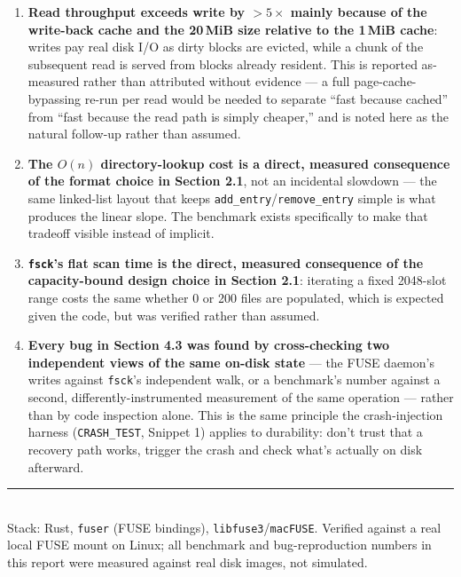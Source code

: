 \documentclass[11pt]{article}
\begin{document}
\begin{enumerate}
    \item \textbf{Read throughput exceeds write by $>5\times$ mainly because of the write-back cache
    and the 20\,MiB size relative to the 1\,MiB cache}: writes pay real disk I/O as dirty blocks are
    evicted, while a chunk of the subsequent read is served from blocks already resident. This is
    reported as-measured rather than attributed without evidence — a full page-cache-bypassing
    re-run per read would be needed to separate ``fast because cached'' from ``fast because the read
    path is simply cheaper,'' and is noted here as the natural follow-up rather than assumed.
    \item \textbf{The $O(n)$ directory-lookup cost is a direct, measured consequence of the format
    choice in Section 2.1}, not an incidental slowdown — the same linked-list layout that keeps
    \texttt{add\_entry}/\texttt{remove\_entry} simple is what produces the linear slope. The
    benchmark exists specifically to make that tradeoff visible instead of implicit.
    \item \textbf{\texttt{fsck}'s flat scan time is the direct, measured consequence of the capacity-bound
    design choice in Section 2.1}: iterating a fixed 2048-slot range costs the same whether 0 or 200
    files are populated, which is expected given the code, but was verified rather than assumed.
    \item \textbf{Every bug in Section 4.3 was found by cross-checking two independent views of the
    same on-disk state} — the FUSE daemon's writes against \texttt{fsck}'s independent walk, or a
    benchmark's number against a second, differently-instrumented measurement of the same operation —
    rather than by code inspection alone. This is the same principle the crash-injection harness
    (\texttt{CRASH\_TEST}, Snippet 1) applies to durability: don't trust that a recovery path works,
    trigger the crash and check what's actually on disk afterward.
\end{enumerate}

\vspace{1em}
\noindent\rule{\textwidth}{0.4pt}\\
\footnotesize
Stack: Rust, \texttt{fuser} (FUSE bindings), \texttt{libfuse3}/\texttt{macFUSE}. Verified against a
real local FUSE mount on Linux; all benchmark and bug-reproduction numbers in this report were
measured against real disk images, not simulated.
\end{document}
